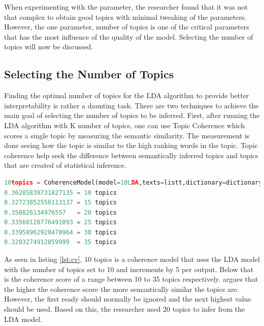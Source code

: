 When experimenting with the parameter, the researcher found that it was not that complex to obtain good topics with minimal tweaking of the parameters. However, the one parameter, number of topics is one of the critical parameters that has the most influence of the quality of the model. Selecting the number of topics will now be discussed.

\subsection{Selecting the Number of Topics} \label{ssc:lekker}
Finding the optimal number of topics for the LDA algorithm to provide better interpretability is rather a daunting task. There are two techniques to achieve the main goal of selecting the number of topics to be inferred.
First, after running the LDA algorithm with K number of topics, one can use Topic Coherence which scores a single topic by measuring the semantic similarity. The measurement is done seeing how the topic is similar to the high ranking words in the topic. Topic coherence help seek the difference between semantically inferred topics and topics that are created of statistical inference. 

\begin{lstlisting}[language=Python, label={lst:cv}, caption=Topic coherence]
10topics = CoherenceModel(model=10LDA,texts=listt,dictionary=dictionary,coherence='c_v')
0.36285839731827135 = 10 topics
0.32723852556113137 = 15 topics
0.358826134976557   = 20 topics
0.33560120776491093 = 25 topics
0.33958962920470964 = 30 topics
0.3203274912859999  = 35 topics
\end{lstlisting}
As seen in listing \ref{lst:cv}, 10 topics is a coherence model that uses the LDA model with the number of topics set to 10 and increments by 5 per output. Below that is the coherence score of a range between 10 to 35 topics respectively. \cite{stevens-etal-2012-exploring} argues that the higher the coherence score the more semantically similar the topics are. However, the first ready should normally be ignored and the next highest value should be used. Based on this, the researcher used 20 topics to infer from the LDA model.

